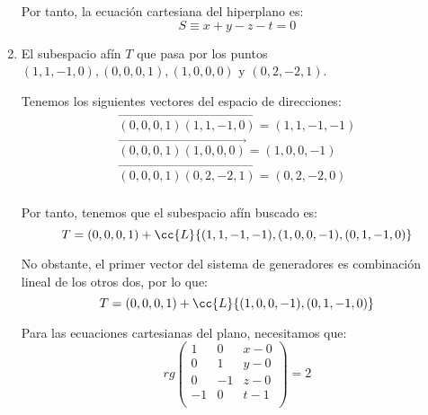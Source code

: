 \begin{ejercicio}
\begin{enumerate}
        Por tanto, la ecuación cartesiana del hiperplano es:
        \begin{equation*}
            S \equiv x+y-z-t=0
        \end{equation*}
        
        \item El subespacio afín $T$ que pasa por los puntos $(1, 1, -1, 0), (0, 0, 0, 1), (1, 0, 0, 0)$ y $(0, 2, -2, 1)$.

        Tenemos los siguientes vectores del espacio de direcciones:
        \begin{gather*}
            \vec{(0,0,0,1)(1,1,-1,0)} = (1,1,-1,-1)\\
            \vec{(0,0,0,1)(1,0,0,0)} = (1,0,0,-1)\\
            \vec{(0,0,0,1)(0,2,-2,1)} = (0,2,-2,0)\\
        \end{gather*}

        Por tanto, tenemos que el subespacio afín buscado es:
        \begin{equation*}
            T = (0,0,0,1) + \cc{L}\{(1,1,-1,-1),(1,0,0,-1),(0,1,-1,0)\}
        \end{equation*}

        No obstante, el primer vector del sistema de generadores es combinación lineal de los otros dos, por lo que:
        \begin{equation*}
            T = (0,0,0,1) + \cc{L}\{(1,0,0,-1),(0,1,-1,0)\}
        \end{equation*}


        Para las ecuaciones cartesianas del plano, necesitamos que:
        \begin{equation*}
            rg\left(\begin{array}{ccc}
                1 & 0 & x-0 \\
                0 & 1 & y-0 \\
                0 & -1 & z-0 \\
                -1 & 0 & t-1 \\
            \end{array}\right) = 2
        \end{equation*}


\end{enumerate}
\end{ejercicio}
